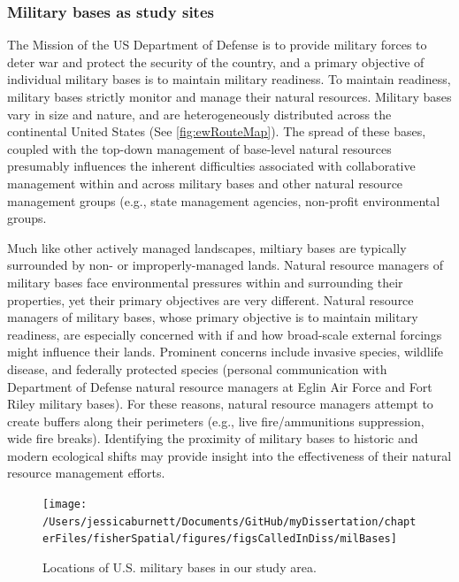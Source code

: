 \documentclass[12pt,twoside,openany]{reedthesis}
\begin{document}
\subsubsection{Military bases as study
sites}\label{military-bases-as-study-sites}

The Mission of the US Department of Defense is to provide military
forces to deter war and protect the security of the country, and a
primary objective of individual military bases is to maintain military
readiness. To maintain readiness, military bases strictly monitor and
manage their natural resources. Military bases vary in size and nature,
and are heterogeneously distributed across the continental United States
(See \ref{fig:ewRouteMap}). The spread of these bases, coupled with the
top-down management of base-level natural resources presumably
influences the inherent difficulties associated with collaborative
management within and across military bases and other natural resource
management groups (e.g., state management agencies, non-profit
environmental groups.

Much like other actively managed landscapes, miltiary bases are
typically surrounded by non- or improperly-managed lands. Natural
resource managers of military bases face environmental pressures within
and surrounding their properties, yet their primary objectives are very
different. Natural resource managers of military bases, whose primary
objective is to maintain military readiness, are especially concerned
with if and how broad-scale external forcings might influence their
lands. Prominent concerns include invasive species, wildlife disease,
and federally protected species (personal communication with Department
of Defense natural resource managers at Eglin Air Force and Fort Riley
military bases). For these reasons, natural resource managers attempt to
create buffers along their perimeters (e.g., live fire/ammunitions
suppression, wide fire breaks). Identifying the proximity of military
bases to historic and modern ecological shifts may provide insight into
the effectiveness of their natural resource management efforts.
\begin{figure}

{\centering \texttt{[image: /Users/jessicaburnett/Documents/GitHub/myDissertation/chapterFiles/fisherSpatial/figures/figsCalledInDiss/milBases]} 

}

\caption{Locations of U.S. military bases in our study area.}\label{fig:milBases}
\end{figure}
\end{document}
